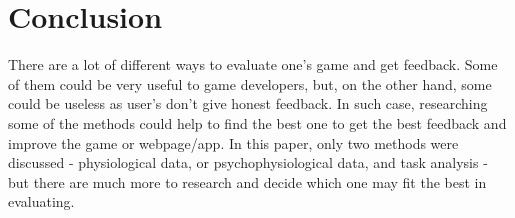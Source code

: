 \documentclass{scrartcl}
\begin{document}
\section{Conclusion}

There are a lot of different ways to evaluate one's game and get feedback. Some of them could be very useful to game developers, but, on the other hand, some could be useless as user's don't give honest feedback. In such case, researching some of the methods could help to find the best one to get the best feedback and improve the game or webpage/app. In this paper, only two methods were discussed - physiological data, or psychophysiological data, and task analysis - but there are much more to research and decide which one may fit the best in evaluating.



\end{document}
